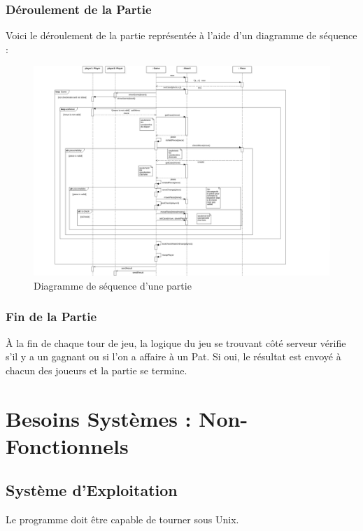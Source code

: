 \documentclass[10pt, a4paper]{article}
\begin{document}
\subsubsection{Déroulement de la Partie}
Voici le déroulement de la partie représentée à l'aide d'un diagramme de séquence : \\

\begin{figure}[ht]
\centering
\includegraphics[scale=0.8]{SequenceDiagramClassicChessTurn.png}
\caption{Diagramme de séquence d'une partie}
\label{SD_classicgame}
\end{figure}
\clearpage



\subsubsection{Fin de la Partie}
À la fin de chaque tour de jeu, la logique du jeu se trouvant côté serveur vérifie s'il y a un gagnant ou si l'on a affaire à un Pat. Si oui, le résultat est envoyé à chacun des joueurs et la partie se termine.


\section{Besoins Systèmes : Non-Fonctionnels}


\subsection{Système d'Exploitation}
Le programme doit être capable de tourner sous Unix. \\
\end{document}
